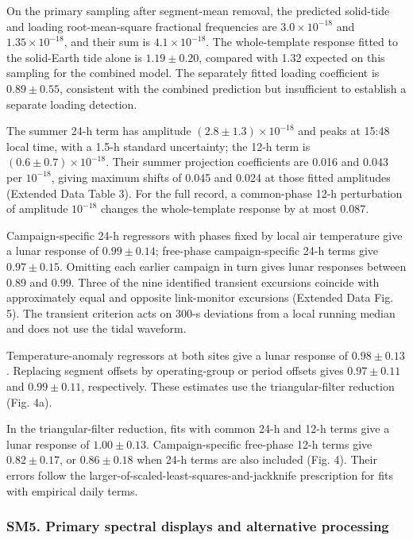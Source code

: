 \documentclass[
  11pt,
  a4paper,
]{article}
\begin{document}
On the primary sampling after segment-mean removal, the predicted
solid-tide and loading root-mean-square fractional frequencies are
\(3.0\times10^{-18}\) and \(1.35\times10^{-18}\), and their sum is
\(4.1\times10^{-18}\). The whole-template response fitted to the
solid-Earth tide alone is \(1.19\pm0.20\), compared with 1.32 expected
on this sampling for the combined model. The separately fitted loading
coefficient is \(0.89\pm0.55\), consistent with the combined prediction
but insufficient to establish a separate loading detection.

The summer 24-h term has amplitude \((2.8\pm1.3)\times10^{-18}\) and
peaks at 15:48 local time, with a 1.5-h standard uncertainty; the 12-h
term is \((0.6\pm0.7)\times10^{-18}\). Their summer projection
coefficients are 0.016 and 0.043 per \(10^{-18}\), giving maximum shifts
of 0.045 and 0.024 at those fitted amplitudes (Extended Data Table 3).
For the full record, a common-phase 12-h perturbation of amplitude
\(10^{-18}\) changes the whole-template response by at most 0.087.

Campaign-specific 24-h regressors with phases fixed by local air
temperature give a lunar response of \(0.99\pm0.14\); free-phase
campaign-specific 24-h terms give \(0.97\pm0.15\). Omitting each earlier
campaign in turn gives lunar responses between 0.89 and 0.99. Three of
the nine identified transient excursions coincide with approximately
equal and opposite link-monitor excursions (Extended Data Fig. 5). The
transient criterion acts on 300-s deviations from a local running median
and does not use the tidal waveform.

Temperature-anomaly regressors at both sites give a lunar response of
\(0.98\pm0.13\). Replacing segment offsets by operating-group or period
offsets gives \(0.97\pm0.11\) and \(0.99\pm0.11\), respectively. These
estimates use the triangular-filter reduction (Fig. 4a).

In the triangular-filter reduction, fits with common 24-h and 12-h terms
give a lunar response of \(1.00\pm0.13\). Campaign-specific free-phase
12-h terms give \(0.82\pm0.17\), or \(0.86\pm0.18\) when 24-h terms are
also included (Fig. 4). Their errors follow the
larger-of-scaled-least-squares-and-jackknife prescription for fits with
empirical daily terms.

\hypertarget{sm5.-primary-spectral-displays-and-alternative-processing}{%
\subsubsection{SM5. Primary spectral displays and alternative
processing}\label{sm5.-primary-spectral-displays-and-alternative-processing}}
\end{document}
